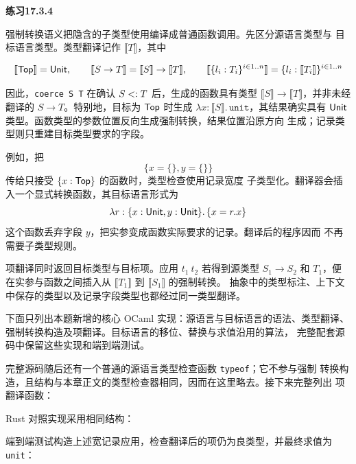 \begin{taplsolutionentrybox}
\label{sol:translator:17.3.4}
\textbf{练习17.3.4}

强制转换语义把隐含的子类型使用编译成普通函数调用。先区分源语言类型与
目标语言类型。类型翻译记作 \(\llbracket T\rrbracket\)，其中

\[
  \llbracket\mathsf{Top}\rrbracket = \mathsf{Unit},\qquad
  \llbracket S\to T\rrbracket
    = \llbracket S\rrbracket\to\llbracket T\rrbracket,\qquad
  \llbracket\{l_i:T_i\}^{i\in1..n}\rrbracket
    = \{l_i:\llbracket T_i\rrbracket\}^{i\in1..n}
\]

因此，\texttt{coerce S T} 在确认 \(S\mathrel{<:} T\) 后，生成的函数具有类型
\(\llbracket S\rrbracket\to\llbracket T\rrbracket\)，并非未经翻译的
\(S\to T\)。特别地，目标为 \(\mathsf{Top}\) 时生成
\(\lambda x:\llbracket S\rrbracket.\,\texttt{unit}\)，其结果确实具有
\(\mathsf{Unit}\) 类型。函数类型的参数位置反向生成强制转换，结果位置沿原方向
生成；记录类型则只重建目标类型要求的字段。

例如，把
\[
  \{x=\{\},y=\{\}\}
\]
传给只接受 \(\{x:\mathsf{Top}\}\) 的函数时，类型检查使用记录宽度
子类型化。翻译器会插入一个显式转换函数，其目标语言形式为
\[
  \lambda r:\{x:\mathsf{Unit},y:\mathsf{Unit}\}.\,\{x=r.x\}
\]
这个函数丢弃字段 \(y\)，把实参变成函数实际要求的记录。翻译后的程序因而
不再需要子类型规则。

项翻译同时返回目标类型与目标项。应用 \(t_1\ t_2\) 若得到源类型
\(S_1\to S_2\) 和 \(T_1\)，便在实参与函数之间插入从
\(\llbracket T_1\rrbracket\) 到 \(\llbracket S_1\rrbracket\) 的强制转换。
抽象中的类型标注、上下文中保存的类型以及记录字段类型也都经过同一类型翻译。

下面只列出本题新增的核心 OCaml 实现：源语言与目标语言的语法、类型翻译、
强制转换构造及项翻译。目标语言的移位、替换与求值沿用的算法，
完整配套源码中保留这些实现和端到端测试。


完整源码随后还有一个普通的源语言类型检查函数 \texttt{typeof}；它不参与强制
转换构造，且结构与本章正文的类型检查器相同，因而在这里略去。接下来完整列出
项翻译函数：


Rust 对照实现采用相同结构：


端到端测试构造上述宽记录应用，检查翻译后的项仍为良类型，并最终求值为
\texttt{unit}：


\end{taplsolutionentrybox}
